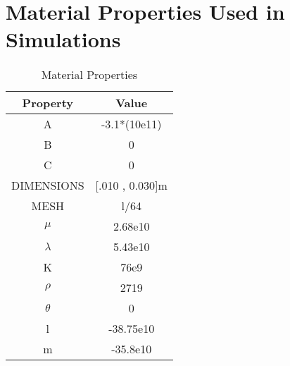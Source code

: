 \documentclass[MTech]{iitmdiss}
\begin{document}
\chapter{Material Properties Used in Simulations}
\begin{table}[ht]
\caption{Material Properties}
\begin{tabular}{|c|c|}
\hline
\textbf{Property} & \textbf{Value} \\ \hline
A & -3.1*(10e11) \\ \hline
B & 0 \\ \hline
C & 0 \\ \hline
DIMENSIONS & [.010 , 0.030]m \\ \hline
MESH & l/64 \\ \hline
$\mu$ & 2.68e10 \\ \hline
$\lambda$ & 5.43e10 \\ \hline
K & 76e9 \\ \hline
$\rho$ & 2719 \\ \hline
$\theta$ & 0 \\ \hline
l & -38.75e10 \\ \hline
m & -35.8e10 \\ \hline
\end{tabular}
\end{table}
%  	
%	

\begin{thebibliography}{9}

\end{thebibliography}
\end{document}
